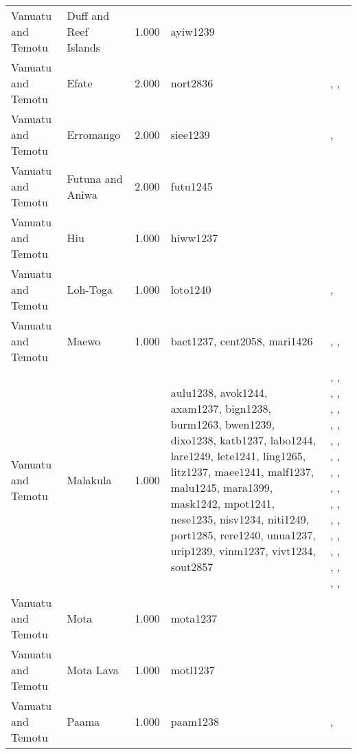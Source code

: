 \begin{longtable}{p{1.8cm}p{1.8cm}p{1.8cm}p{2cm}p{7cm}}
  Vanuatu and Temotu & Duff and Reef Islands & 1.000 & ayiw1239 & \citet{davenport1969} \\ 
  Vanuatu and Temotu & Efate & 2.000 & nort2836 & \citet{facey1981hereditary}, \citet{facey1981hereditary}, \citet{facey1981hereditary} \\ 
  Vanuatu and Temotu & Erromango & 2.000 & siee1239 & \citet{humphreys1926}, \citet{spriggs1989archaeological} \\ 
  Vanuatu and Temotu & Futuna and Aniwa & 2.000 & futu1245 & \citet{capell1958culture} \\ 
  Vanuatu and Temotu & Hiu & 1.000 & hiww1237 & \citet{bonnemaison1996power} \\ 
  Vanuatu and Temotu & Loh-Toga & 1.000 & loto1240 & \citet{bonnemaison1996power}, \citet{bonnemaison1996power} \\ 
  Vanuatu and Temotu & Maewo & 1.000 & baet1237, cent2058, mari1426 & \citet{bonnemaison1996power}, \citet{bonnemaison1996power}, \citet{bonnemaison1996power} \\ 
  Vanuatu and Temotu & Malakula & 1.000 & aulu1238, avok1244, axam1237, bign1238, burm1263, bwen1239, dixo1238, katb1237, labo1244, lare1249, lete1241, ling1265, litz1237, maee1241, malf1237, malu1245, mara1399, mask1242, mpot1241, nese1235, nisv1234, niti1249, port1285, rere1240, unua1237, urip1239, vinm1237, vivt1234, sout2857 & \citet{bonnemaison1996power}, \citet{bonnemaison1996power}, \citet{bonnemaison1996power}, \citet{bonnemaison1996power}, \citet{bonnemaison1996power}, \citet{bonnemaison1996power}, \citet{bonnemaison1996power}, \citet{bonnemaison1996power}, \citet{bonnemaison1996power}, \citet{bonnemaison1996power}, \citet{bonnemaison1996power}, \citet{bonnemaison1996power}, \citet{bonnemaison1996power}, \citet{bonnemaison1996power}, \citet{bonnemaison1996power}, \citet{bonnemaison1996power}, \citet{bonnemaison1996power}, \citet{bonnemaison1996power}, \citet{bonnemaison1996power}, \citet{bonnemaison1996power}, \citet{bonnemaison1996power}, \citet{bonnemaison1996power}, \citet{bonnemaison1996power}, \citet{bonnemaison1996power}, \citet{bonnemaison1996power}, \citet{bonnemaison1996power}, \citet{bonnemaison1996power}, \citet{bonnemaison1996power}, \citet{deacon1934} \\ 
  Vanuatu and Temotu & Mota & 1.000 & mota1237 & \citet{bonnemaison1996power} \\ 
  Vanuatu and Temotu & Mota Lava & 1.000 & motl1237 & \citet{bonnemaison1996power} \\ 
  Vanuatu and Temotu & Paama & 1.000 & paam1238 & \citet{bonnemaison1996power}, \citet{bonnemaison1996power} \\ 

\end{longtable}
